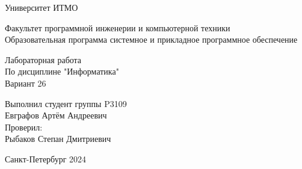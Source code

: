 

\thispagestyle{empty}
\begin{center}
\LARGE{Университет ИТМО} 
\vspace{20pt}

\LARGE{Факультет программной инженерии и компьютерной техники \\
Образовательная программа системное и прикладное программное обеспечение}
\vspace{160pt}

\LARGE{Лабораторная работа   \\
По дисциплине "Информатика" \\ 
Вариант 26}
\vspace{120pt}
\end{center}

\begin{flushright}
\LARGE{Выполнил студент группы P3109 \\
Евграфов Артём Андреевич \\
Проверил:\\
Рыбаков Степан Дмитриевич}
\vspace{120pt}
\end{flushright}

\begin{center}
\Large{Санкт-Петербург 2024}
\end{center}

\newpage
\setcounter{page}{1}
\tableofcontents
\newpage

